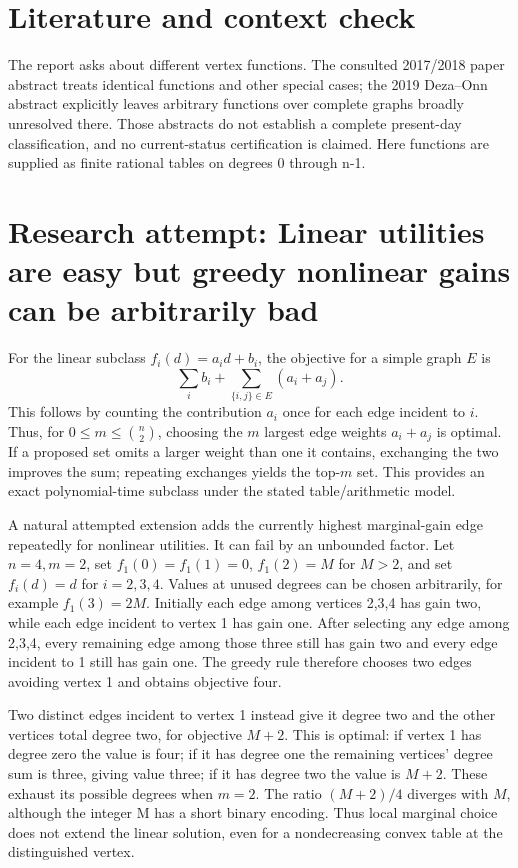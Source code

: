 \documentclass[11pt]{article}
\begin{document}
\section{Literature and context check}
The report asks about different vertex functions. The consulted 2017/2018 paper abstract treats identical functions and other special cases; the 2019 Deza--Onn abstract explicitly leaves arbitrary functions over complete graphs broadly unresolved there. Those abstracts do not establish a complete present-day classification, and no current-status certification is claimed. Here functions are supplied as finite rational tables on degrees 0 through n-1.
\section{Research attempt: Linear utilities are easy but greedy nonlinear gains can be arbitrarily bad}
For the linear subclass $f_i(d)=a_i d+b_i$, the objective for a simple graph $E$ is
\[
\sum_i b_i+\sum_{\{i,j\}\in E}(a_i+a_j).
\]
This follows by counting the contribution $a_i$ once for each edge incident to $i$. Thus, for $0\le m\le\binom n2$, choosing the $m$ largest edge weights $a_i+a_j$ is optimal. If a proposed set omits a larger weight than one it contains, exchanging the two improves the sum; repeating exchanges yields the top-$m$ set. This provides an exact polynomial-time subclass under the stated table/arithmetic model.

A natural attempted extension adds the currently highest marginal-gain edge repeatedly for nonlinear utilities. It can fail by an unbounded factor. Let $n=4,m=2$, set $f_1(0)=f_1(1)=0$, $f_1(2)=M$ for $M>2$, and set $f_i(d)=d$ for $i=2,3,4$. Values at unused degrees can be chosen arbitrarily, for example $f_1(3)=2M$. Initially each edge among vertices 2,3,4 has gain two, while each edge incident to vertex 1 has gain one. After selecting any edge among 2,3,4, every remaining edge among those three still has gain two and every edge incident to 1 still has gain one. The greedy rule therefore chooses two edges avoiding vertex 1 and obtains objective four.

Two distinct edges incident to vertex 1 instead give it degree two and the other vertices total degree two, for objective $M+2$. This is optimal: if vertex 1 has degree zero the value is four; if it has degree one the remaining vertices' degree sum is three, giving value three; if it has degree two the value is $M+2$. These exhaust its possible degrees when $m=2$. The ratio $(M+2)/4$ diverges with $M$, although the integer M has a short binary encoding. Thus local marginal choice does not extend the linear solution, even for a nondecreasing convex table at the distinguished vertex.
\end{document}
